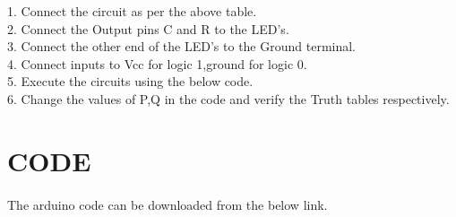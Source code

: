 \documentclass[a4paper,11pt,twocolumn]{article}
\begin{document}
   1. Connect the circuit as per the above table.\\
   2. Connect the Output pins C and R to the LED's.\\
   3. Connect the other end of the LED's to the Ground terminal.\\
   4. Connect inputs to Vcc for logic 1,ground for logic 0.\\
   5. Execute the circuits using the below code.\\
   6. Change the values of P,Q in the code and verify the Truth tables respectively.\\

\section{CODE}
\paragraph{}
	The arduino code can be downloaded from the below link.
\begin{center} 
\end{center}
\end{document}
